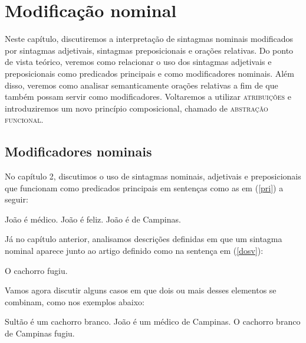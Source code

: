 
\chapter{Modificação nominal}

Neste capítulo, discutiremos a interpretação de sintagmas nominais modificados por sintagmas adjetivais, sintagmas preposicionais e orações relativas. Do ponto de vista teórico, veremos como relacionar o uso dos
sintagmas adjetivais e preposicionais como predicados principais e
como modificadores nominais. Além disso, veremos como analisar semanticamente
orações relativas a fim de que também possam servir como
modificadores. Voltaremos a utilizar \textsc{atribuições} e
introduziremos um novo princípio composicional, chamado de
\textsc{abstração funcional}.

\section{Modificadores nominais}

No capítulo 2, discutimos o uso de sintagmas nominais, adjetivais
e preposicionais que funcionam como predicados principais em
sentenças como as em (\ref{pri}) a seguir:

\begin{exe}
\ex\label{pri}
\begin{xlist}
\ex João é médico.\label{pria}
\ex João é feliz.\label{prib}
\ex João é de Campinas.\label{pric}
\end{xlist}
\end{exe}

\n Já no capítulo anterior, analisamos descrições definidas em que
um sintagma nominal aparece junto ao artigo definido como na
sentença em (\ref{dosv}):

\begin{exe}
\ex O cachorro fugiu.\label{dosv}
\end{exe}


\n Vamos agora discutir alguns casos em que dois ou mais desses
elementos se combinam, como nos
exemplos abaixo:

\begin{exe}
\ex\label{pc}
\begin{xlist}
\ex Sultão é um cachorro branco.\label{pca}
\ex João é um médico de Campinas. \label{pcb}
\ex O cachorro branco de Campinas fugiu.\label{pcc}
\end{xlist}
\end{exe}

